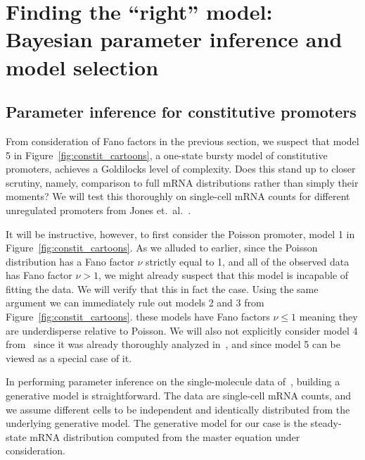 \section{Finding the ``right'' model: Bayesian parameter inference and model 
selection}
\subsection{Parameter inference for constitutive promoters}

From consideration of Fano factors in the previous section, we suspect that
model 5 in Figure~\ref{fig:constit_cartoons}, a one-state bursty model of
constitutive promoters, achieves a Goldilocks level of complexity. Does this
stand up to closer scrutiny, namely, comparison to full mRNA distributions
rather than simply their moments? We will test this thoroughly on
single-cell mRNA counts for different unregulated promoters from Jones et.\
al.~\cite{Jones2014}.

It will be instructive, however, to first consider the Poisson promoter, model 1
in Figure~\ref{fig:constit_cartoons}. As we alluded to earlier, since the
Poisson distribution has a Fano factor $\nu$ strictly equal to 1, and all of
the observed data has Fano factor $\nu>1$, we might already suspect that this
model is incapable of fitting the data. We will verify that this in fact the
case. Using the same argument we can immediately rule out models 2 and 3 from 
Figure~\ref{fig:constit_cartoons}. these models have Fano factors $\nu\le 1$
meaning they are underdisperse relative to Poisson. We will also not explicitly
consider model 4 from~\fig{fig:constit_cartoons} since it was already thoroughly
analyzed in~\cite{Razo-Mejia2020}, and since model 5 can be viewed as a special
case of it.

In performing parameter inference on the single-molecule data
of~\cite{Jones2014}, building a generative model is straightforward. The data
are single-cell mRNA counts, and we assume different cells to be independent and
identically distributed from the underlying generative model. The generative
model for our case is the steady-state mRNA distribution computed from the
master equation under consideration.

